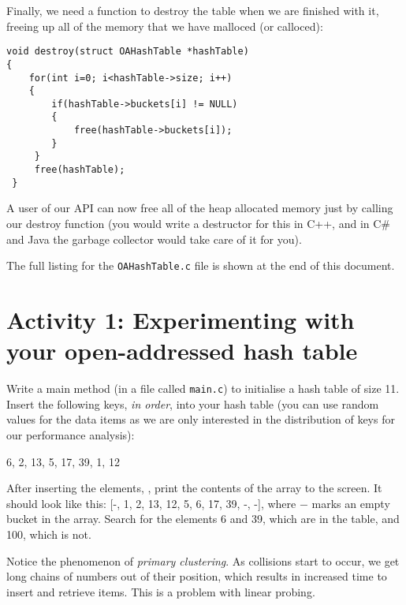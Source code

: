 \documentclass[10pt, a4paper, twosize]{article}
\begin{document}
Finally, we need a function to destroy the table when we are finished with it, freeing up all of the memory that we have malloced (or calloced):
\begin{lstlisting}
void destroy(struct OAHashTable *hashTable)
{
	for(int i=0; i<hashTable->size; i++)
	{
		if(hashTable->buckets[i] != NULL)
		{
			free(hashTable->buckets[i]);
		}
 	 }
 	 free(hashTable);
 }
\end{lstlisting}
A user of our API can now free all of the heap allocated memory just by calling our destroy function (you would write a destructor for this in C++, and in C\# and Java the garbage collector would take care of it for you).

The full listing for the \texttt{OAHashTable.c} file is shown at the end of this document.

\section{Activity 1: Experimenting with your open-addressed hash table}
Write a main method (in a file called \texttt{main.c}) to initialise a hash table of size 11. Insert the following keys, \emph{in order}, into your hash table (you can use random values for the data items as we are only interested in the distribution of keys for our performance analysis):

6, 2, 13, 5, 17, 39, 1, 12

After inserting the elements, , print the contents of the array to the screen. It should look like this: [-, 1, 2, 13, 12, 5, 6, 17, 39, -, -], where $-$ marks an empty bucket in the array. Search for the elements 6 and 39, which are in the table, and 100, which is not.
 
Notice the phenomenon of \emph{primary clustering}. As collisions start to occur, we get long chains of numbers out of their position, which results in increased time to insert and retrieve items. This is a problem with linear probing.
\end{document}
